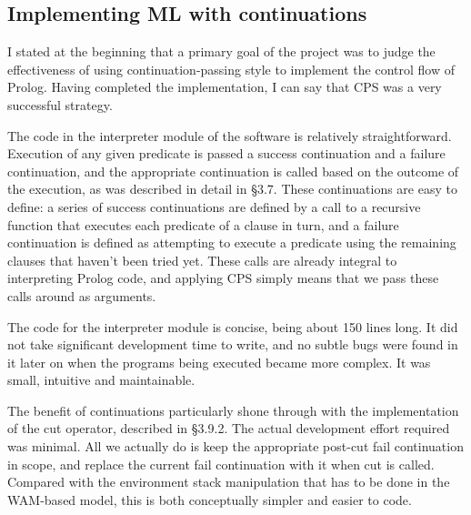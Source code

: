 \documentclass[12pt]{article}
\begin{document}



\subsection{Implementing ML with continuations}

I stated at the beginning that a primary goal of the project was to judge the effectiveness of using continuation-passing style to implement the control flow of Prolog. 
Having completed the implementation, I can say that CPS was a very successful strategy.

The code in the interpreter module of the software is relatively straightforward. 
Execution of any given predicate is passed a success continuation and a failure continuation, and the appropriate continuation is called based on the outcome of the execution, as was described in detail in \S3.7. 
These continuations are easy to define: a series of success continuations are defined by a call to a recursive function that executes each predicate of a clause in turn, and a failure continuation is defined as attempting to execute a predicate using the remaining clauses that haven't been tried yet. 
These calls are already integral to interpreting Prolog code, and applying CPS simply means that we pass these calls around as arguments.

The code for the interpreter module is concise, being about 150 lines long. 
It did not take significant development time to write, and no subtle bugs were found in it later on when the programs being executed became more complex. 
It was small, intuitive and maintainable.

The benefit of continuations particularly shone through with the implementation of the cut operator, described in \S3.9.2.
The actual development effort required was minimal.
All we actually do is keep the appropriate post-cut fail continuation in scope, and replace the current fail continuation with it when cut is called.
Compared with the environment stack manipulation that has to be done in the WAM-based model, this is both conceptually simpler and easier to code.
\end{document}
